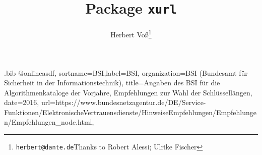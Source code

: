 %
\listfiles\setcounter{errorcontextlines}{100}
\RequirePackage{filecontents}
\begin{filecontents*}{\jobname.bib}
@online{asdf,
  sortname={BSI},label={BSI},
  organization={BSI (Bundesamt für Sicherheit in der Informationstechnik)},
  title={Angaben des BSI für die Algorithmenkataloge der Vorjahre, Empfehlungen zur Wahl der Schlüssellängen},
  date={2016},
  url={https://www.bundesnetzagentur.de/DE/Service-Funktionen/ElektronischeVertrauensdienste/HinweiseEmpfehlungen/Empfehlungen/Empfehlungen_node.html},
}
\end{filecontents*}
\documentclass[paper=a4,fontsize=11pt,DIV=14,parskip=half-,
               captions=tableabove,twoside=on]{scrartcl}
\usepackage{fontspec}
\setmainfont{AccanthisADFStdNo3}[
  UprightFont   =*-Regular,
  BoldFont      =*-Bold,
  ItalicFont    =*-Italic,
  BoldItalicFont=*-BoldItalic,
  RawFeature    = -rlig,
]
\setsansfont{GilliusADF}[
  UprightFont   =*-Regular,
  BoldFont      =*-Bold,
  ItalicFont    =*-Italic,
  BoldItalicFont=*-BoldItalic,
  RawFeature    = -rlig,
]
\setmonofont{Anonymous Pro}[Scale=MatchLowercase,FakeStretch=0.9]

\usepackage[english]{babel}
\usepackage{scrlayer-scrpage}
\automark*[subsection]{}
\pagestyle{scrheadings}

\usepackage{biblatex}



\usepackage{xurl}
\title{Package \texttt{xurl}}
\author{Herbert Voß\thanks{\texttt{herbert@dante.de}\newline Thanks to Robert Alessi; Ulrike Fischer}}

\maketitle

\section{How it works}
Package xurl loads package url by default and defines
possible url breaks for all alphanumerical characters
and \verb|= / . : * - ~ ' "| 

